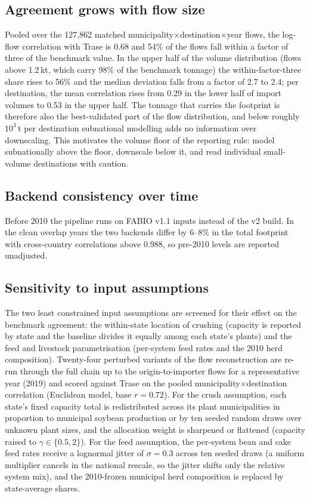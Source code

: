 \documentclass[pdflatex,sn-nature]{sn-jnl}%
\begin{document}
\subsection{Agreement grows with flow size}\label{subsec:val-volume}
Pooled over the 127{,}862 matched
municipality$\times$destination$\times$year flows, the log-flow
correlation with Trase is 0.68 and 54\% of the flows fall within a
factor of three of the benchmark value. In the upper half of the volume
distribution (flows above 1.2\,kt, which carry 98\% of the benchmark
tonnage) the within-factor-three share rises to 56\% and the median
deviation falls from a factor of 2.7 to 2.4; per destination, the mean
correlation rises from 0.29 in the lower half of import volumes to 0.53
in the upper half. The tonnage that carries the footprint is therefore
also the best-validated part of the flow distribution, and below roughly
$10^3$\,t per destination subnational modelling adds no information over
downscaling. This motivates the volume floor of the reporting rule:
model subnationally above the floor, downscale below it, and read
individual small-volume destinations with caution.

\subsection{Backend consistency over time}\label{subsec:val-backend}
Before 2010 the pipeline runs on FABIO v1.1 inputs instead of the v2
build. In the clean overlap years the two backends differ by 6--8\% in
the total footprint with cross-country correlations above 0.988, so
pre-2010 levels are reported unadjusted.

\subsection{Sensitivity to input assumptions}\label{subsec:val-inputs}
The two least constrained input assumptions are screened for their
effect on the benchmark agreement: the within-state location of
crushing (capacity is reported by state and the baseline divides it
equally among each state's plants) and the feed and livestock
parametrisation (per-system feed rates and the 2010 herd composition).
Twenty-four perturbed variants of the flow reconstruction are re-run
through the full chain up to the origin-to-importer flows for a
representative year (2019) and scored against Trase on the pooled
municipality$\times$destination correlation (Euclidean model, base
$r=0.72$). For the crush assumption, each state's fixed capacity total
is redistributed across its plant municipalities in proportion to
municipal soybean production or by ten seeded random draws over unknown
plant sizes, and the allocation weight is sharpened or flattened
(capacity raised to $\gamma\in\{0.5,2\}$). For the feed assumption, the
per-system bean and cake feed rates receive a lognormal jitter of
$\sigma=0.3$ across ten seeded draws (a uniform multiplier cancels in
the national rescale, so the jitter shifts only the relative system
mix), and the 2010-frozen municipal herd composition is replaced by
state-average shares.
\end{document}
